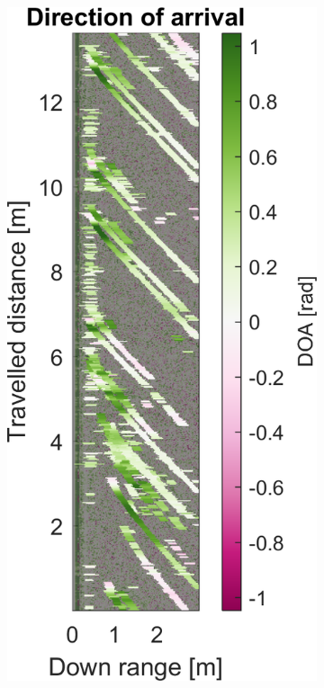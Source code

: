 \begin{figure}[htbp]
\begin{subfigure}[t]{0.475\linewidth}
    \end{subfigure}\bigskip\\
    \begin{subfigure}[t]{0.475\linewidth}  
        \centering 
        \includegraphics[width=\linewidth,max height=.475\textheight]{gfx/results/publicrestroom_doa.png}

\end{subfigure}
\end{figure}
